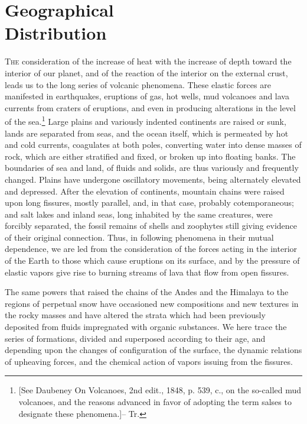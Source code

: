 
\chapter{Geographical \\Distribution}

\lettrine[lines=4]{\goudy T}{he} consideration of the increase of heat with the increase of depth toward the interior of our planet, and of the reaction of the interior on the external crust, leads us to the long series of volcanic phenomena. These elastic forces are manifested in earthquakes, eruptions of gas, hot wells, mud volcanoes and lava currents from craters of eruptions, and even in producing alterations in the level of the sea.\footnote{[See Daubeney On Volcanoes, 2nd edit., 1848, p. 539, c., on the so-called mud volcanoes, and the reasons advanced in favor of adopting the term salses to designate these phenomena.]-- Tr.} Large plains and variously indented continents are raised or sunk, lands are separated from seas, and the ocean itself, which is permeated by hot and cold currents, coagulates at both poles, converting water into dense masses of rock, which are either stratified and fixed, or broken up into floating banks. The boundaries of sea and land, of fluids and solids, are thus variously and frequently changed. Plains have undergone oscillatory movements, being alternately elevated and depressed. After the elevation of continents, mountain chains were raised upon long fissures, mostly parallel, and, in that case, probably cotemporaneous; and salt lakes and inland seas, long inhabited by the same creatures, were forcibly separated, the fossil remains of shells and zoophytes still giving evidence of their original connection. Thus, in following phenomena in their mutual dependence, we are led from the consideration of the forces acting in the interior of the Earth to those which cause eruptions on its surface, and by the pressure of elastic vapors give rise to burning streams of lava that flow from open fissures.

The same powers that raised the chains of the Andes and the Himalaya to the regions of perpetual snow have occasioned new compositions and new textures in the rocky masses and have altered the strata which had been previously deposited from fluids impregnated with organic substances. We here trace the series of formations, divided and superposed according to their age, and depending upon the changes of configuration of the surface, the dynamic relations of upheaving forces, and the chemical action of vapors issuing from the fissures.

